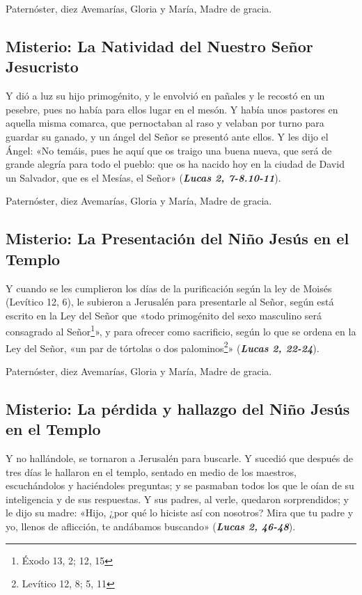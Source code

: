 \documentclass[./main.tex]{subfiles}
\newcounter{joyful-counter}
\begin{document}
\begin{center}
      Paternóster, diez Avemarías, Gloria y María, Madre de gracia.
\end{center}

\subsection*{ Misterio: La Natividad del Nuestro Señor Jesucristo}
Y dió a luz su hijo primogénito, y le envolvió en pañales y le recostó en un pesebre, pues no había para ellos lugar en el mesón.
Y había unos pastores en aquella misma comarca, que pernoctaban al raso y velaban por turno para guardar su ganado,
y un ángel del Señor se presentó ante ellos. Y les dijo el Ángel: «No temáis, pues he aquí que os traigo una buena nueva,
que será de grande alegría para todo el pueblo: que os ha nacido hoy en la ciudad de David un Salvador, que es el Mesías, el Señor» (\textbf{\emph{Lucas 2, 7-8.10-11}}).

\begin{center}
      Paternóster, diez Avemarías, Gloria y María, Madre de gracia.
\end{center}

\subsection*{ Misterio: La Presentación del Niño Jesús en el Templo}
Y cuando se les cumplieron los días de la purificación según la ley de Moisés (Levítico 12, 6),
le subieron a Jerusalén para presentarle al Señor, según está escrito en la Ley del Señor que «todo primogénito
del sexo masculino será consagrado al Señor\footnote{Éxodo 13, 2; 12, 15}», y para ofrecer como sacrificio,
según lo que se ordena en la Ley del Señor, «un par de tórtolas o dos palominos\footnote{Levítico 12, 8; 5, 11}» (\textbf{\emph{Lucas 2, 22-24}}).

\begin{center}
      Paternóster, diez Avemarías, Gloria y María, Madre de gracia.
\end{center}

\subsection*{ Misterio: La pérdida y hallazgo del Niño Jesús en el Templo}
Y no hallándole, se tornaron a Jerusalén para buscarle. Y sucedió que después de tres días le hallaron en el templo,
sentado en medio de los maestros, escuchándolos y haciéndoles preguntas; y se pasmaban todos los que le oían de su
inteligencia y de sus respuestas. Y sus padres, al verle, quedaron sorprendidos; y le dijo su madre:
«Hijo, ¿por qué lo hiciste así con nosotros? Mira que tu padre y yo, llenos de aflicción, te andábamos buscando» (\textbf{\emph{Lucas 2, 46-48}}).
\end{document}
